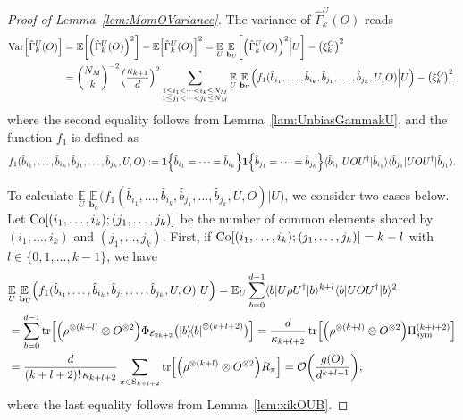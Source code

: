 \documentclass[aps,prl,twocolumn,nofootinbib,superscriptaddress,10pt]{revtex4-2}
\let\originalleft\left
\let\originalright\right
\renewcommand{\left}{\mathopen{}\mathclose\bgroup\originalleft}
\renewcommand{\right}{\aftergroup\egroup\originalright}
\def\E{ {\mathbb E} } %
\def\>{\rangle}
\def\<{\langle}
\newcommand{\ketbra}[2]{\ensuremath{\left|#1\right\rangle\!\left\langle#2\right|}}
\DeclareMathOperator{\Var}{Var}
\DeclareMathOperator{\Tr}{tr}
\newcommand{\bigo}[1]{\mathcal{O}\left(#1\right)}
\theoremstyle{plain}
\theoremstyle{definition}
\newcommand{\lref}[1]{Lemma~\ref{#1}}
\begin{document}
\begin{proof}[Proof of \lref{lem:MomOVariance}]
The variance of $\hat{\Gamma}_k^U (O)$ reads
\begin{align}\label{eq:GammakUO} 
\Var\left[ \hat{\Gamma}_k^U (O)\right] 
&= \E\left[ \left( \hat{\Gamma}_k^U (O)\right) ^2 \right] - \E\left[ \hat{\Gamma}_k^U (O) \right]^2 
= \underset{U }{\E} \, \underset{\,\mathbf{b}_{U}}{\E} \left[ \left( \hat{\Gamma}_k^U (O)\right) ^2 \Big| U \right]
- \left( \xi_k^{O}\right) ^2
\nonumber\\
&= \binom{N_M}{k}^{-2} \left( \frac{\kappa_{k+1}}{d}\right)^2
\sum_{\substack{1\leq i_1<\dots<i_k\leq N_M \\ 1\leq j_1<\dots<j_k\leq N_M}} 
\underset{U }{\E} \, \underset{\,\mathbf{b}_{U}}{\E} \Big(
f_1(\hat{b}_{i_1},\dots,\hat{b}_{i_k},\hat{b}_{j_1},\dots,\hat{b}_{j_k}, U,O)\Big| U \Big) 
-\left( \xi_k^{O}\right) ^2. 
\end{align}
where the second equality follows from \lref{lam:UnbiasGammakU}, and the function $f_1$ is defined as 
\begin{align}
f_1(\hat{b}_{i_1},\dots,\hat{b}_{i_k},\hat{b}_{j_1},\dots,\hat{b}_{j_k}, U,O)
:=
\textbf{1}\left\{\hat{b}_{i_1}=\dots=\hat{b}_{i_k}\right\}  
\textbf{1}\left\{\hat{b}_{j_1}=\dots=\hat{b}_{j_k}\right\} 
\<\hat{b}_{i_1}|UO U^{\dag}|\hat{b}_{i_1}\> \<\hat{b}_{j_1}|UO U^{\dag}|\hat{b}_{j_1}\>. 
\end{align} 

To calculate $\underset{U }{\E} \, \underset{\,\mathbf{b}_{U}}{\E} \Big(
f_1(\hat{b}_{i_1},\dots,\hat{b}_{i_k},\hat{b}_{j_1},\dots,\hat{b}_{j_k}, U,O)\Big| U \Big)$, we consider two cases below. 
Let ${\rm Co}[(i_1,\dots,i_k);(j_1,\dots,j_k)]$ be the number of common elements shared by $(i_1,\dots,i_k)$ and $(j_1,\dots,j_k)$. 
First, if ${\rm Co}[(i_1,\dots,i_k);(j_1,\dots,j_k)]=k-l$ with $l\in\{0,1,\dots,k-1\}$, we have 
\begin{align}\label{eq:EEfcasea}
&\underset{U }{\E} \, \underset{\,\mathbf{b}_{U}}{\E} \Big(
f_1(\hat{b}_{i_1},\dots,\hat{b}_{i_k},\hat{b}_{j_1},\dots,\hat{b}_{j_k}, U,O)\Big| U \Big)
= 
\E_{U} \sum_{b=0}^{d-1} \<b|U\rho U^{\dag}|b\>^{k+l} \<b|UO U^{\dag}|b\>^2
\nonumber\\
&=\sum_{b=0}^{d-1} \Tr \left[ \left( \rho^{\otimes (k+l)} \otimes O^{\otimes 2}\right)  \Phi_{\mathcal E_{2k+2}} \big( \ketbra{b}{b}^{\otimes (k+l+2)} \big) \right] 
=
\frac{d}{\kappa_{k+l+2}} \Tr \left[ \left( \rho^{\otimes (k+l)} \otimes O^{\otimes 2}\right)  \Pi_{\mathrm{sym}}^{(k+l+2)} \right] 
\nonumber\\
&=
\frac{d}{(k+l+2)!\, \kappa_{k+l+2}} \sum_{\pi\in \mathrm{S}_{k+l+2}} \Tr\left[ \left( \rho^{\otimes {(k+l)}}\otimes O^{\otimes 2}\right)  R_\pi \right]
 = \bigo{\frac{g(O)}{d^{k+l+1}}} ,
\end{align}
where the last equality follows from \lref{lem:xikOUB}. 


\end{proof}
\end{document}
